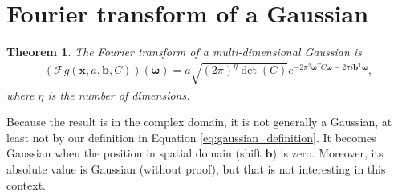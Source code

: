 \documentclass{paper}
\newtheorem{theorem}{Theorem}
\newcommand{\F}{\ensuremath{\mathcal{F}}}
\newcommand{\vr}[1]{\ensuremath{\boldsymbol{#1}}}
\newcommand{\omegavec}[0]{\ensuremath{\vr{\omega{}}}}
\newcommand{\bvec}[0]{\ensuremath{\vr{b}}}
\begin{document}
\clearpage
\section{Fourier transform of a Gaussian}
\begin{theorem}
	The Fourier transform of a multi-dimensional Gaussian is
	\begin{align}
	\label{eq:gaussian_fourier_transform}
	(\F g(\vr{x}, a, \bvec, C))(\omegavec) = a \sqrt{(2 \pi)^\eta \det(C)} e^{-2 \pi^2 \omegavec^T C \omegavec - 2\pi i \bvec^T \omegavec},
	\end{align}
	where $\eta$ is the number of dimensions.
\end{theorem}
Because the result is in the complex domain, it is not generally a Gaussian, at least not by our definition in Equation \ref{eq:gaussian_definition}.
It becomes Gaussian when the position in spatial domain (shift $\bvec$) is zero.
Moreover, its absolute value is Gaussian (without proof), but that is not interesting in this context.
\end{document}
